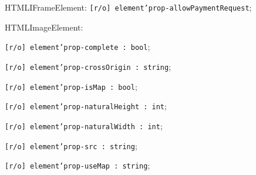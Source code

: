 \begin{icItems}
	\item HTMLIFrameElement: \texttt{[r/o] element'prop-allowPaymentRequest};
	
	\item HTMLImageElement:
	\begin{icItems}
		\item \texttt{[r/o] element'prop-complete : bool};
		\item \texttt{[r/o] element'prop-crossOrigin : string};
		\item \texttt{[r/o] element'prop-isMap : bool};
		\item \texttt{[r/o] element'prop-naturalHeight : int};
		\item \texttt{[r/o] element'prop-naturalWidth : int};
		\item \texttt{[r/o] element'prop-src : string};
		\item \texttt{[r/o] element'prop-useMap : string};
	\end{icItems}
	

\end{icItems}
